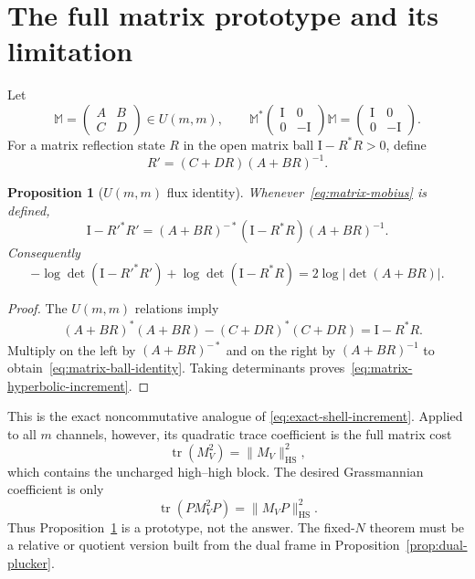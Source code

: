 \documentclass[11pt]{article}
\newcommand{\C}{\mathbb C}
\newcommand{\Id}{\mathrm I}
\newcommand{\HS}{\mathrm{HS}}
\newtheorem{proposition}{Proposition}[section]
\theoremstyle{definition}
\begin{document}
\section{The full matrix prototype and its limitation}

Let
\begin{equation}
 \mathbb M=\begin{pmatrix}A&B\\C&D\end{pmatrix}\in U(m,m),
 \qquad
 \mathbb M^*\begin{pmatrix}\Id&0\\0&-\Id\end{pmatrix}\mathbb M
 =\begin{pmatrix}\Id&0\\0&-\Id\end{pmatrix}.
 \label{eq:umm}
\end{equation}
For a matrix reflection state $R$ in the open matrix ball
$\Id-R^*R>0$, define
\begin{equation}
 R'=(C+DR)(A+BR)^{-1}.
 \label{eq:matrix-mobius}
\end{equation}

\begin{proposition}[$U(m,m)$ flux identity]
\label{prop:umm-flux}
Whenever~\eqref{eq:matrix-mobius} is defined,
\begin{equation}
 \Id-R'^*R'
 =(A+BR)^{-*}(\Id-R^*R)(A+BR)^{-1}.
 \label{eq:matrix-ball-identity}
\end{equation}
Consequently
\begin{equation}
 -\log\det(\Id-R'^*R')
 +\log\det(\Id-R^*R)
 =2\log|\det(A+BR)|.
 \label{eq:matrix-hyperbolic-increment}
\end{equation}
\end{proposition}

\begin{proof}
The $U(m,m)$ relations imply
\begin{align}
 &(A+BR)^*(A+BR)-(C+DR)^*(C+DR)
 =\Id-R^*R.
 \label{eq:umm-subtraction}
\end{align}
Multiply on the left by $(A+BR)^{-*}$ and on the right by
$(A+BR)^{-1}$ to obtain~\eqref{eq:matrix-ball-identity}.  Taking determinants
proves~\eqref{eq:matrix-hyperbolic-increment}.
\end{proof}

This is the exact noncommutative analogue of
\eqref{eq:exact-shell-increment}.  Applied to all $m$ channels, however, its
quadratic trace coefficient is the full matrix cost
\begin{equation}
 \operatorname{tr}(M_V^2)=\|M_V\|_{\HS}^2,
 \label{eq:unsafe-full-cost}
\end{equation}
which contains the uncharged high--high block.  The desired Grassmannian
coefficient is only
\begin{equation}
 \operatorname{tr}(PM_V^2P)=\|M_VP\|_{\HS}^2.
 \label{eq:safe-low-column-cost}
\end{equation}
Thus Proposition~\ref{prop:umm-flux} is a prototype, not the answer.  The
fixed-$N$ theorem must be a relative or quotient version built from the dual
frame in Proposition~\ref{prop:dual-plucker}.
\end{document}
